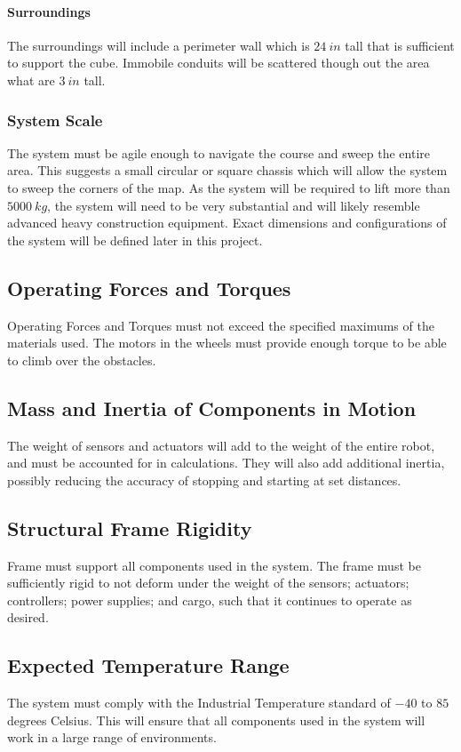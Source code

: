 \documentclass[12pt]{article}
\begin{document}
\paragraph{Surroundings} The surroundings will include a perimeter wall which is $24 \: in$ tall that is sufficient to support the cube. Immobile conduits will be scattered though out the area what are $3 \: in$ tall. 

\subsubsection{System Scale} 
The system must be agile enough to navigate the course and sweep the entire area. This suggests a small circular or square chassis which will allow the system to sweep the corners of the map. As the system will be required to lift more than $5000 \: kg$, the system will need to be very substantial and will likely resemble advanced heavy construction equipment. Exact dimensions and configurations of the system will be defined later in this project.

\subsection{Operating Forces and Torques}
Operating Forces and Torques must not exceed the specified maximums of the materials used. The motors in the wheels must provide enough torque to be able to climb over the obstacles.
\subsection{Mass and Inertia of Components in Motion}
The weight of sensors and actuators will add to the weight of the entire robot, and must be accounted for in calculations. They will also add additional inertia, possibly reducing the accuracy of stopping and starting at set distances.
\subsection{Structural Frame Rigidity}
Frame must support all components used in the system. The frame must be sufficiently rigid to not deform under the weight of the sensors; actuators; controllers; power supplies; and cargo, such that it continues to operate as desired.
\subsection{Expected Temperature Range}
The system must comply with the Industrial Temperature standard of $-40$ to $85$ degrees Celsius. This will ensure that all components used in the system will work in a large range of environments. \\
\end{document}
